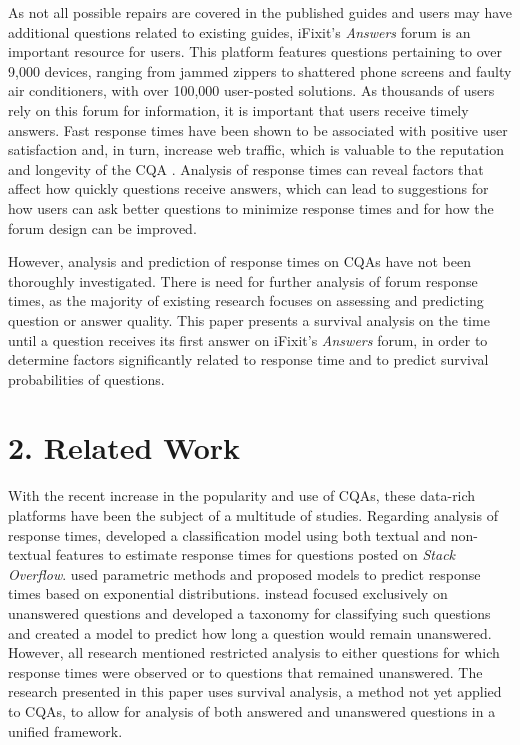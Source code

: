 \documentclass{article}
\begin{document}
As not all possible repairs are covered in the published guides and users may have additional questions related to existing guides, iFixit's \textit{Answers} forum is an important resource for users. This platform features questions pertaining to over 9,000 devices, ranging from jammed zippers to shattered phone screens and faulty air conditioners, with over 100,000 user-posted solutions. As thousands of users rely on this forum for information, it is important that users receive timely answers. Fast response times have been shown to be associated with positive user satisfaction and, in turn, increase web traffic, which is valuable to the reputation and longevity of the CQA \cite{Rechavi2011}. Analysis of response times can reveal factors that affect how quickly questions receive answers, which can lead to suggestions for how users can ask better questions to minimize response times and for how the forum design can be improved.

However, analysis and prediction of response times on CQAs have not been thoroughly investigated. There is need for further analysis of forum response times, as the majority of existing research focuses on assessing and predicting question or answer quality. This paper presents a survival analysis on the time until a question receives its first answer on iFixit's \textit{Answers} forum, in order to determine factors significantly related to response time and to predict survival probabilities of questions.


\section*{2. Related Work}
  
With the recent increase in the popularity and use of CQAs, these data-rich platforms have been the subject of a multitude of studies. Regarding analysis of response times, \cite{Bhat2014} developed a classification model using both textual and non-textual features to estimate response times for questions posted on \textit{Stack Overflow}. \cite{Mahmud2013} used parametric methods and proposed models to predict response times based on exponential distributions. \cite{Asaduzzaman2013} instead focused exclusively on unanswered questions and developed a taxonomy for classifying such questions and created a model to predict how long a question would remain unanswered. However, all research mentioned restricted analysis to either questions for which response times were observed or to questions that remained unanswered. The research presented in this paper uses survival analysis, a method not yet applied to CQAs, to allow for analysis of both answered and unanswered questions in a unified framework. 
\end{document}
